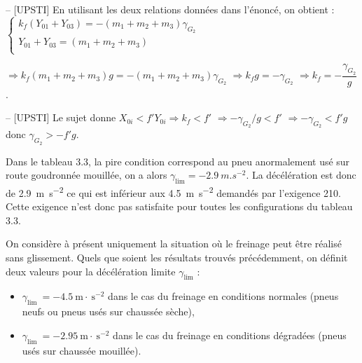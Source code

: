 \ifprof
\begin{corrige}-- [UPSTI]
En utilisant les deux relations données dans l’énoncé, on obtient : 
$\left\{
\begin{array}{l}
k_f (Y_{01}+Y_{03} )=-(m_1+m_2+m_3 ) \gamma_{G_2 }\\
Y_{01}+Y_{03}=(m_1+m_2+m_3 ) \\
\end{array}
\right.$

$\Rightarrow k_f (m_1+m_2+m_3 )g=-(m_1+m_2+m_3 ) \gamma_{G_2}$
$\Rightarrow  k_f g=-\gamma_{G_2}$
$\Rightarrow  k_f =-\dfrac{\gamma_{G_2}}{g}$.


\end{corrige}
\else
\fi

\ifprof
\begin{corrige}-- [UPSTI]
Le sujet donne $X_{0i}<f'Y_{0i} \Rightarrow k_f<f'$ 
$\Rightarrow -\gamma_{G_2}/g<f'$ 
$\Rightarrow -\gamma_{G_2}<f'g$ 
donc $\gamma_{G_2}>-f'g$.

Dans le tableau 3.3, la pire condition correspond au pneu anormalement usé sur route goudronnée mouillée, on a alors $\gamma_{\text{lim}}=- \SI{2,9}{m.s^{-2}}$. La décélération est donc de \SI{2,9}{m.s^{-2}} ce qui est inférieur aux \SI{4,5}{m.s^{-2}} demandés par l’exigence 210. Cette exigence n’est donc pas satisfaite pour toutes les configurations du tableau 3.3.

\end{corrige}
\else
\fi

\ifprof\else

On considère à présent uniquement la situation où le freinage peut être réalisé sans glissement. Quels que soient les résultats trouvés précédemment, on définit deux valeurs pour la décélération limite \(\gamma_{\text{lim}}\) :

\begin{itemize}
  \item \(\gamma_{\text {lim }}=-4.5 \mathrm{~m} \cdot \mathrm{~s}^{-2}\) dans le cas du freinage en conditions normales (pneus neufs ou pneus usés sur chaussée sèche),
  \item \(\gamma_{\text {lim }}=-2.95 \mathrm{~m} \cdot \mathrm{~s}^{-2}\) dans le cas du freinage en conditions dégradées (pneus usés sur chaussée mouillée).
\end{itemize}

